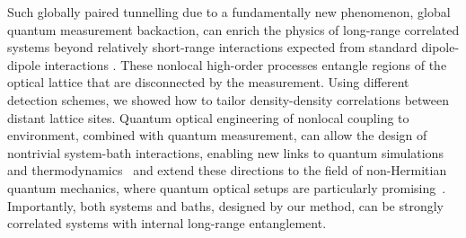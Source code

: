 Such globally paired tunnelling due to a fundamentally new phenomenon,
global quantum measurement backaction, can enrich the physics of
long-range correlated systems beyond relatively short-range
interactions expected from standard dipole-dipole interactions
\cite{sowinski2012, omjyoti2015}. These nonlocal high-order processes
entangle regions of the optical lattice that are disconnected by the
measurement. Using different detection schemes, we showed how to
tailor density-density correlations between distant lattice
sites. Quantum optical engineering of nonlocal coupling to
environment, combined with quantum measurement, can allow the design
of nontrivial system-bath interactions, enabling new links to quantum
simulations~\cite{stannigel2013} and thermodynamics~\cite{erez2008}
and extend these directions to the field of non-Hermitian quantum
mechanics, where quantum optical setups are particularly
promising~\cite{lee2014prl}. Importantly, both systems and baths,
designed by our method, can be strongly correlated systems with
internal long-range entanglement.
